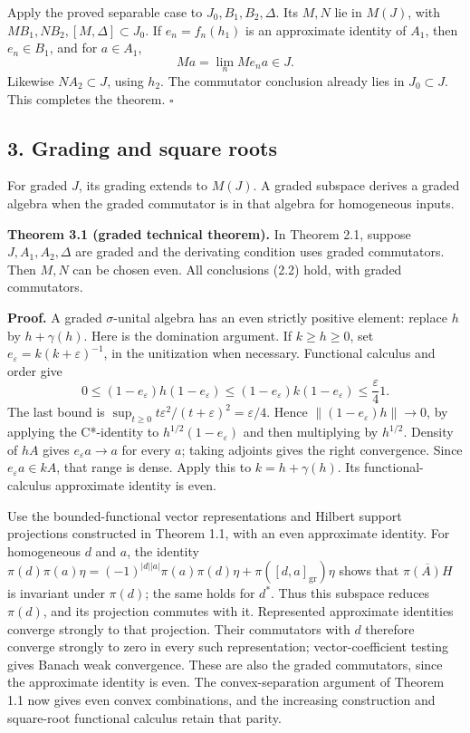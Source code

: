 \documentclass[
  11pt,
]{article}
\begin{document}
Apply the proved separable case to \(J_0,B_1,B_2,\Delta\). Its \(M,N\)
lie in \(M(J)\), with \(MB_1,NB_2,[M,\Delta]\subset J_0\). If
\(e_n=f_n(h_1)\) is an approximate identity of \(A_1\), then
\(e_n\in B_1\), and for \(a\in A_1\), \[
Ma=\lim_n Me_na\in J.
\tag{2.13}
\] Likewise \(NA_2\subset J\), using \(h_2\). The commutator conclusion
already lies in \(J_0\subset J\). This completes the theorem.
\(\square\)

\subsection{3. Grading and square roots}\label{grading-and-square-roots}

For graded \(J\), its grading extends to \(M(J)\). A graded subspace
derives a graded algebra when the graded commutator is in that algebra
for homogeneous inputs.

\textbf{Theorem 3.1 (graded technical theorem).} In Theorem 2.1, suppose
\(J,A_1,A_2,\Delta\) are graded and the derivating condition uses graded
commutators. Then \(M,N\) can be chosen even. All conclusions (2.2)
hold, with graded commutators.

\textbf{Proof.} A graded \(\sigma\)-unital algebra has an even strictly
positive element: replace \(h\) by \(h+\gamma(h)\). Here is the
domination argument. If \(k\ge h\ge0\), set
\(e_\varepsilon=k(k+\varepsilon)^{-1}\), in the unitization when
necessary. Functional calculus and order give \[
0\le(1-e_\varepsilon)h(1-e_\varepsilon)
\le(1-e_\varepsilon)k(1-e_\varepsilon)
\le\frac{\varepsilon}{4}1.
\] The last bound is
\(\sup_{t\ge0}t\varepsilon^2/(t+\varepsilon)^2=\varepsilon/4\). Hence
\(\|(1-e_\varepsilon)h\|\to0\), by applying the C*-identity to
\(h^{1/2}(1-e_\varepsilon)\) and then multiplying by \(h^{1/2}\).
Density of \(hA\) gives \(e_\varepsilon a\to a\) for every \(a\); taking
adjoints gives the right convergence. Since \(e_\varepsilon a\in kA\),
that range is dense. Apply this to \(k=h+\gamma(h)\). Its
functional-calculus approximate identity is even.

Use the bounded-functional vector representations and Hilbert support
projections constructed in Theorem 1.1, with an even approximate
identity. For homogeneous \(d\) and \(a\), the identity
\(\pi(d)\pi(a)\eta=(-1)^{|d||a|}\pi(a)\pi(d)\eta+\pi([d,a]_{\mathrm{gr}})\eta\)
shows that \(\overline{\pi(A)H}\) is invariant under \(\pi(d)\); the
same holds for \(d^*\). Thus this subspace reduces \(\pi(d)\), and its
projection commutes with it. Represented approximate identities converge
strongly to that projection. Their commutators with \(d\) therefore
converge strongly to zero in every such representation;
vector-coefficient testing gives Banach weak convergence. These are also
the graded commutators, since the approximate identity is even. The
convex-separation argument of Theorem 1.1 now gives even convex
combinations, and the increasing construction and square-root functional
calculus retain that parity.
\end{document}
